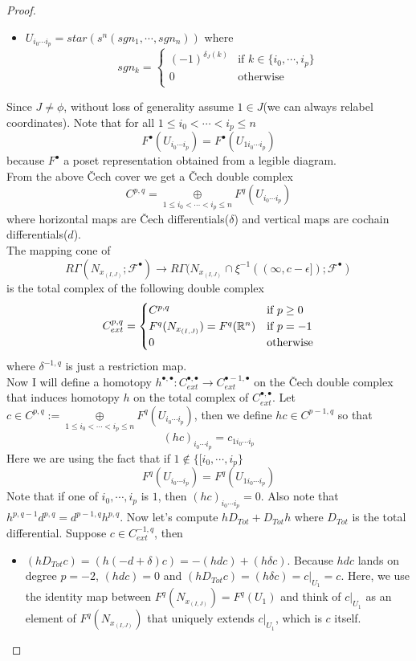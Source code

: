 \begin{proof}
\begin{itemize}
\item $U_{i_0\cdots i_p} = star(s^n(sgn_1,\cdots, sgn_n))$ where
\[
sgn_k=
\begin{cases}
    (-1)^{\delta_J(k)} & \text{if } k\in \{i_0,\cdots,i_p\}\\
    0 & \text{otherwise}\\
\end{cases}
\]
\end{itemize}
Since $J\neq \phi$, without loss of generality assume $1\in J$(we can always relabel coordinates). Note that for all $1\leq i_0 <\cdots<i_p\leq n$
\[
F^\bullet(U_{i_0\cdots i_p}) = F^\bullet(U_{1i_0\cdots i_p})
\]
because $F^\bullet$ a poset representation obtained from a legible diagram.\\
From the above \v{C}ech cover we get a \v{C}ech double complex
\[
C^{p,q} = \underset{1\leq i_0<\cdots < i_p \leq n}{\oplus} F^q(U_{i_0\cdots i_p})
\]
where horizontal maps are \v{C}ech differentials($\delta$) and vertical maps are cochain differentials($d$).\\
The mapping cone of 
\[R\Gamma(N_{x_{(I,J)}};\mathscr{F}^\bullet) \rightarrow R\Gamma(N_{x_{(I,J)}} \cap \xi^{-1}((\infty,c-\epsilon]);\mathscr{F}^\bullet)
\]
is the total complex of the following double complex
\[
C_{ext}^{p,q}=
\begin{cases}
    C^{p,q} & \text{if } p\geq 0\\
    F^q(N_{x_{(I,J)}}) = F^q(\mathbb{R}^n) & \text{if } p=-1\\
    0 & \text{otherwise}\\
\end{cases}
\]
where $\delta^{-1,q}$ is just a restriction map.\\
Now I will define a homotopy $h^{\bullet,\bullet} : C_{ext}^{\bullet,\bullet} \rightarrow C_{ext}^{\bullet -1,\bullet}$ on the \v{C}ech double complex that induces homotopy $h$ on the total complex of $C_{ext}^{\bullet,\bullet}$.
Let $c\in C^{p,q}:= \underset{1\leq i_0 < \cdots< i_p \leq n}{\oplus} F^q(U_{i_0\cdots i_p})$, then we define $hc \in C^{p-1,q}$ so that 
\[
(hc)_{i_0\cdots i_p} = c_{1i_0\cdots i_p}
\]
Here we are using the fact that if $1 \not\in \{[i_0,\cdots,i_p\}$ 
\[
F^q(U_{i_0\cdots i_p}) = F^q(U_{1i_0\cdots i_p})
\]
Note that if one of $i_0,\cdots, i_p$ is $1$, then $(hc)_{i_0\cdots i_p}=0$. Also note that $h^{p,q-1} d^{p,q} = d^{p-1,q} h^{p,q}$.
Now let's compute $h D_{Tot} + D_{Tot}h$ where $D_{Tot}$ is the total differential. Suppose $c\in C_{ext}^{-1,q}$, then
\begin{itemize}
\item $(hD_{Tot}c) = (h(-d+\delta)c) = -(hdc) + (h\delta c)$. Because $hdc$ lands on degree $p=-2$, $(hdc)=0$ and $(hD_{Tot}c)=(h\delta c) = c|_{U_1}=c$. Here, we use the identity map between $F^q(N_{x_{(I,J)}}) = F^q(U_1)$ and think of $c|_{U_1}$ as an element of $F^q(N_{x_{(I,J)}})$ that uniquely extends $c|_{U_1}$, which is $c$ itself.


\end{itemize}
\end{proof}
